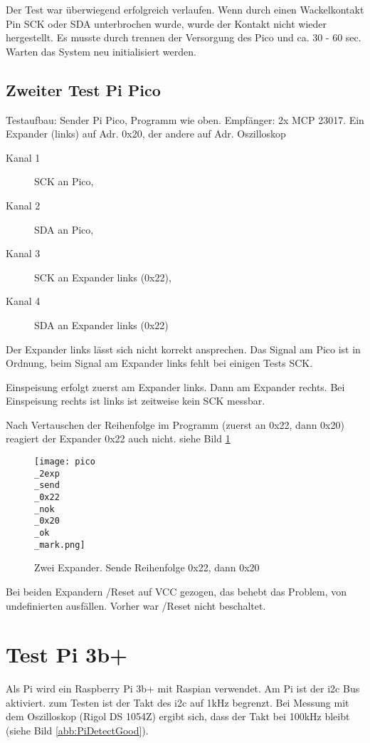\documentclass[a4paper,10pt]{scrartcl}
\begin{document}
Der Test war überwiegend erfolgreich verlaufen. Wenn durch einen Wackelkontakt Pin SCK oder SDA unterbrochen wurde, wurde der Kontakt nicht wieder hergestellt. Es musste durch trennen der Versorgung des Pico und ca. 30 - 60 sec. Warten das System neu initialisiert werden.
\subsection{Zweiter Test Pi Pico}
Testaufbau: Sender Pi Pico, Programm wie oben. Empfänger: 2x MCP 23017. Ein Expander (links) auf Adr. 0x20, der andere auf Adr. Oszilloskop
\begin{description}
 \item[Kanal 1] SCK an Pico,
 \item[Kanal 2] SDA an Pico,
 \item[Kanal 3] SCK an Expander links (0x22),
 \item[Kanal 4] SDA an Expander links (0x22)
\end{description}
Der Expander links lässt sich nicht korrekt ansprechen. Das Signal am Pico ist in Ordnung, beim Signal am Expander links fehlt bei einigen Tests SCK.

Einspeisung erfolgt zuerst am Expander links. Dann am Expander rechts. Bei Einspeisung rechts ist links ist zeitweise kein SCK messbar.

Nach Vertauschen der Reihenfolge im Programm (zuerst an 0x22, dann 0x20) reagiert der Expander 0x22 auch nicht. siehe Bild \ref{abb:0x20ok0x22nok}

\begin{figure}[htb]
 \texttt{[image: pico\\\_2exp\\\_send\\\_0x22\\\_nok\\\_0x20\\\_ok\\\_mark.png]}
  \caption{Zwei Expander. Sende Reihenfolge 0x22, dann 0x20}
 \label{abb:0x20ok0x22nok}
\end{figure}


Bei beiden Expandern /Reset auf VCC gezogen, das behebt das Problem, von undefinierten ausfällen. Vorher war /Reset nicht beschaltet.

\section{Test Pi 3b+}

Als Pi wird ein Raspberry Pi 3b+ mit Raspian verwendet. Am Pi ist der i2c Bus aktiviert.
zum Testen ist der Takt des i2c auf 1kHz begrenzt. Bei Messung mit dem Oszilloskop (Rigol DS 1054Z) ergibt sich, dass der Takt bei 100kHz bleibt (siehe Bild \ref{abb:PiDetectGood}).
\end{document}
